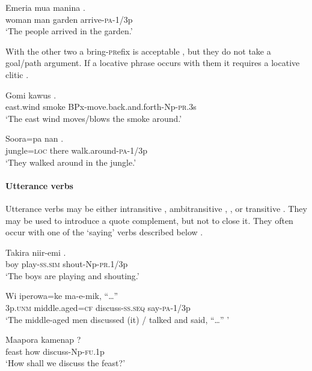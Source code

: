 \ea%
\label{ex:3:x292}
\gll Emeria mua manina . \\
woman man garden arrive-\textsc{pa}-1/3p \\
\glt`The people arrived in the garden.'
\z

With the other two a bring-\textsc{pr}efix is acceptable , but they do not take a goal/path argument. If a locative phrase occurs with them it requires a locative clitic .

\ea%
\label{ex:3:x293}
\gll Gomi kawus . \\
east.wind smoke BPx-move.back.and.forth-Np-\textsc{pr}.3s \\
\glt`The east wind moves/blows the smoke around.'
\z

\ea%
\label{ex:3:x436}
\gll Soora=pa nan . \\
jungle=\textsc{loc} there walk.around-\textsc{pa}-1/3p \\
\glt`They walked around in the jungle.'
\z

\paragraph{Utterance verbs}\label{sec:3.8.4.4.6}
{}
Utterance verbs may be either intransitive , ambitransitive , , or transitive . They may be used to introduce a quote complement, but not to close it. They often occur with one of the `saying' verbs described below .

\ea%
\label{ex:3:x309}
\gll Takira niir-emi . \\
boy play-\textsc{ss}.\textsc{sim} shout-Np-\textsc{pr}.1/3p \\
\glt`The boys are playing and shouting.'
\z

\ea%
\label{ex:3:x310}
\gll Wi iperowa=ke  ma-e-mik, ``{\dots}'' \\
3p.\textsc{unm} middle.aged=\textsc{cf} discuss-\textsc{ss}.\textsc{seq} say-\textsc{pa}-1/3p\\
\glt`The middle-aged men discussed (it) / talked and said, ``{\dots}'' '
\z

\ea%
\label{ex:3:x1927}
\gll Maapora kamenap ? \\
feast how discuss-Np-\textsc{fu}.1p\\
\glt`How shall we discuss the feast?'
\z

